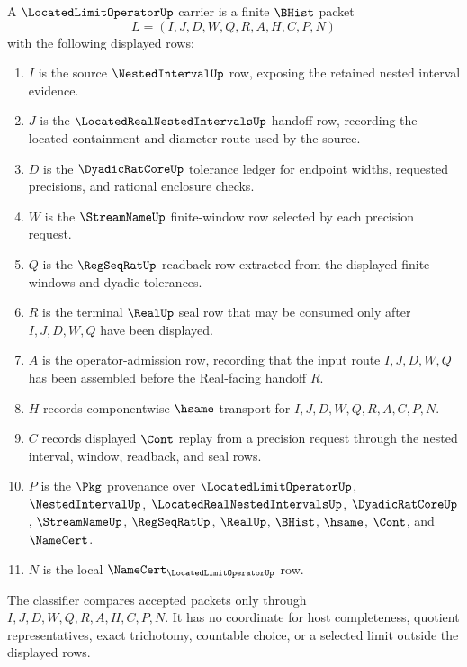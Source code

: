 \begin{definition}
\label{def:located-limit-operator-carrier}
A $\LocatedLimitOperatorUp$ carrier is a finite $\BHist$ packet
$$
L=(I,J,D,W,Q,R,A,H,C,P,N)
$$
with the following displayed rows:
\begin{enumerate}
\item $I$ is the source $\NestedIntervalUp$ row, exposing the retained nested interval evidence.
\item $J$ is the $\LocatedRealNestedIntervalsUp$ handoff row, recording the located containment and diameter route used by the source.
\item $D$ is the $\DyadicRatCoreUp$ tolerance ledger for endpoint widths, requested precisions, and rational enclosure checks.
\item $W$ is the $\StreamNameUp$ finite-window row selected by each precision request.
\item $Q$ is the $\RegSeqRatUp$ readback row extracted from the displayed finite windows and dyadic tolerances.
\item $R$ is the terminal $\RealUp$ seal row that may be consumed only after $I,J,D,W,Q$ have been displayed.
\item $A$ is the operator-admission row, recording that the input route $I,J,D,W,Q$ has been assembled before the Real-facing handoff $R$.
\item $H$ records componentwise $\hsame$ transport for $I,J,D,W,Q,R,A,C,P,N$.
\item $C$ records displayed $\Cont$ replay from a precision request through the nested interval, window, readback, and seal rows.
\item $P$ is the $\Pkg$ provenance over $\LocatedLimitOperatorUp$, $\NestedIntervalUp$, $\LocatedRealNestedIntervalsUp$, $\DyadicRatCoreUp$, $\StreamNameUp$, $\RegSeqRatUp$, $\RealUp$, $\BHist$, $\hsame$, $\Cont$, and $\NameCert$.
\item $N$ is the local $\NameCert_{\LocatedLimitOperatorUp}$ row.
\end{enumerate}
The classifier compares accepted packets only through $I,J,D,W,Q,R,A,H,C,P,N$. It has no coordinate for host completeness, quotient representatives, exact trichotomy, countable choice, or a selected limit outside the displayed rows.
\end{definition}

